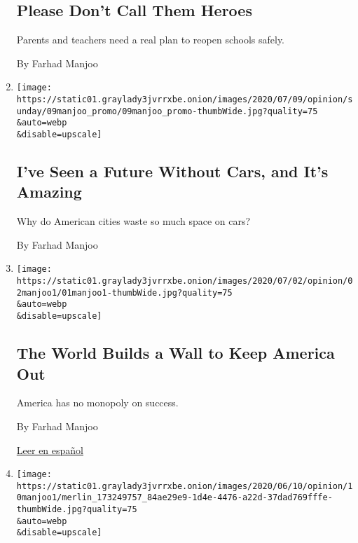 \begin{enumerate}
  \hypertarget{please-dont-call-them-heroes}{%
  \subsection{Please Don't Call Them
  Heroes}\label{please-dont-call-them-heroes}}

  Parents and teachers need a real plan to reopen schools safely.

  By Farhad Manjoo
\item
  \href{/2020/07/09/opinion/sunday/ban-cars-manhattan-cities.html}{}

  \texttt{[image: https://static01.graylady3jvrrxbe.onion/images/2020/07/09/opinion/sunday/09manjoo\_promo/09manjoo\_promo-thumbWide.jpg?quality=75\\\&auto=webp\\\&disable=upscale]}

  \hypertarget{ive-seen-a-future-without-cars-and-its-amazing}{%
  \subsection{I've Seen a Future Without Cars, and It's
  Amazing}\label{ive-seen-a-future-without-cars-and-its-amazing}}

  Why do American cities waste so much space on cars?

  By Farhad Manjoo
\item
  \href{/2020/07/01/opinion/us-travel-ban-europe.html}{}

  \texttt{[image: https://static01.graylady3jvrrxbe.onion/images/2020/07/02/opinion/02manjoo1/01manjoo1-thumbWide.jpg?quality=75\\\&auto=webp\\\&disable=upscale]}

  \hypertarget{the-world-builds-a-wall-to-keep-america-out}{%
  \subsection{The World Builds a Wall to Keep America
  Out}\label{the-world-builds-a-wall-to-keep-america-out}}

  America has no monopoly on success.

  By Farhad Manjoo

  \href{https://www.nytimes3xbfgragh.onion/es/2020/07/03/espanol/opinion/prohibicion-viajar-europa.html}{Leer
  en español}
\item
  \href{/2020/06/10/opinion/black-lives-matter-protests.html}{}

  \texttt{[image: https://static01.graylady3jvrrxbe.onion/images/2020/06/10/opinion/10manjoo1/merlin\_173249757\_84ae29e9-1d4e-4476-a22d-37dad769fffe-thumbWide.jpg?quality=75\\\&auto=webp\\\&disable=upscale]}


\end{enumerate}
